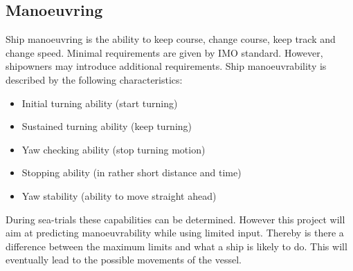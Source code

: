 \subsection{Manoeuvring}
\label{apps:hydro-model}
Ship manoeuvring is the ability to keep course, change course, keep track and change speed. Minimal requirements are given by \ac{IMO} standard. However, shipowners may introduce additional requirements. 
Ship manoeuvrability is described by the following characteristics: 
\begin{itemize}
	\item Initial turning ability (start turning)
	\item Sustained turning ability (keep turning)
	\item Yaw checking ability (stop turning motion)
	\item Stopping ability (in rather short distance and time)
	\item Yaw stability (ability to move straight ahead)
\end{itemize}
During sea-trials these capabilities can be determined. However this project will aim at predicting manoeuvrability while using limited input. Thereby is there a difference between the maximum limits and what a ship is likely to do. This will eventually lead to the possible movements of the vessel.


